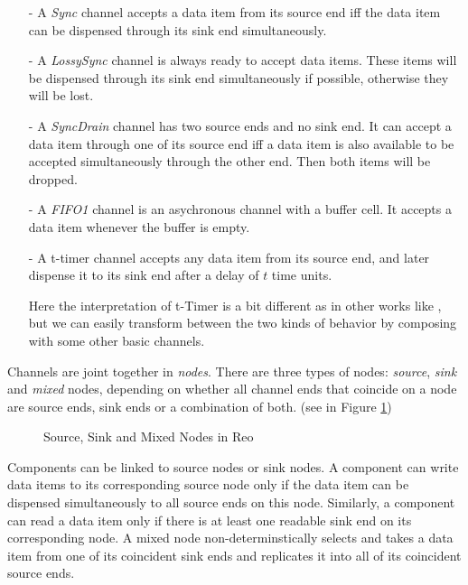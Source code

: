 \documentclass[conference, a4paper]{IEEEtran}
\begin{document}
\begin{itemize}
  \item [-] A \emph{Sync} channel accepts a data item from its source end iff the data item can be
    dispensed through its sink end simultaneously.
  \item [-] A \emph{LossySync} channel is always ready to accept data items. These items will be
    dispensed through its sink end simultaneously if possible, otherwise they will be lost.
  \item [-] A \emph{SyncDrain} channel has two source ends and no sink end. It can accept a data
    item through one of its source end iff a data item is also available to be accepted
    simultaneously through the other end. Then both items will be dropped.
  \item [-] A \emph{FIFO1} channel is an asychronous channel with a buffer cell. It accepts a
    data item whenever the buffer is empty. 
  \item [-] A t-timer channel accepts any data item from its source end, and later dispense it to
    its sink end after a delay of $t$ time units.
    \begin{footnote}
      Here the interpretation of t-Timer is a bit different as in other works like
      \cite{DBLP:conf/sefm/ArbabBBR04, DBLP:conf/tase/Meng12}, but we can easily transform between the
      two kinds of behavior by composing with some other basic channels.
    \end{footnote}
\end{itemize}

Channels are joint together in \emph{nodes}. There are three types of nodes:
\emph{source}, \emph{sink} and \emph{mixed} nodes, depending on whether all channel ends that
coincide on a node are source ends, sink ends or a combination of both.
(see in Figure \ref{fig:node})

\begin{figure}[ht]
  \begin{center}
    
  \end{center}
  \caption{Source, Sink and Mixed Nodes in Reo}
  \label{fig:node}
\end{figure}

Components can be linked to source nodes or sink nodes. A component can write data items to its
corresponding source node only if the data item can be dispensed simultaneously to all source ends
on this node. Similarly, a component can read a data item only if there is at least one readable
sink end on its corresponding node. A mixed node non-determinstically selects and takes a data item
from one of its coincident sink ends and replicates it into all of its coincident source ends.
\end{document}
